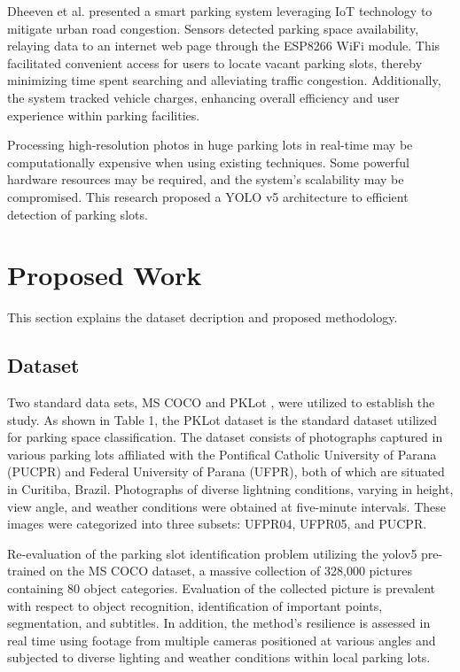 \documentclass[conference]{IEEEtran}
\begin{document}
Dheeven et al. \cite{dheeven2024iot} presented a smart parking system leveraging IoT technology to mitigate urban road congestion. Sensors detected parking space availability, relaying data to an internet web page through the ESP8266 WiFi module. This facilitated convenient access for users to locate vacant parking slots, thereby minimizing time spent searching and alleviating traffic congestion. Additionally, the system tracked vehicle charges, enhancing overall efficiency and user experience within parking facilities.

Processing high-resolution photos in huge parking lots in real-time may be computationally expensive when using existing techniques. Some powerful hardware resources may be required, and the system's scalability may be compromised. This research proposed a YOLO v5 architecture to efficient detection of parking slots.

\section{Proposed Work}\label{sec3}
This section explains the dataset decription and proposed methodology.

\subsection{Dataset}
Two standard data sets, MS COCO \cite{lin2014microsoft} and PKLot \cite{de2015pklot}, were utilized to establish the study. As shown in Table 1, the PKLot dataset is the standard dataset utilized for parking space classification. The dataset consists of photographs captured in various parking lots affiliated with the Pontifical Catholic University of Parana (PUCPR) and Federal University of Parana (UFPR), both of which are situated in Curitiba, Brazil. Photographs of diverse lightning conditions, varying in height, view angle, and weather conditions were obtained at five-minute intervals. These images were categorized into three subsets: UFPR04, UFPR05, and PUCPR.

Re-evaluation of the parking slot identification problem utilizing the yolov5 pre-trained on the MS COCO dataset, a massive collection of 328,000 pictures containing 80 object categories. Evaluation of the collected picture is prevalent with respect to object recognition, identification of important points, segmentation, and subtitles. In addition, the method's resilience is assessed in real time using footage from multiple cameras positioned at various angles and subjected to diverse lighting and weather conditions within local parking lots.
\end{document}
